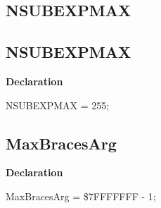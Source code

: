 \documentclass{report}
\newif\ifpdf
\begin{document}
\subsection*{\large{\textbf{NSUBEXPMAX}}\normalsize\hspace{1ex}\hrulefill}
\else
\subsection*{NSUBEXPMAX}
\fi
\label{RegExpr-NSUBEXPMAX}
\begin{list}{}{
\setlength{\itemindent}{0cm}
\setlength{\listparindent}{0cm}
\setlength{\leftmargin}{\evensidemargin}
\addtolength{\leftmargin}{\tmplength}
\settowidth{\labelsep}{X}
\addtolength{\leftmargin}{\labelsep}
\setlength{\labelwidth}{\tmplength}
}
\item[\textbf{Declaration}\hfill]
\ifpdf
\begin{flushleft}
\fi
\begin{ttfamily}
NSUBEXPMAX = 255;\end{ttfamily}

\ifpdf
\end{flushleft}
\fi

\end{list}
\ifpdf
\subsection*{\large{\textbf{MaxBracesArg}}\normalsize\hspace{1ex}\hrulefill}
\else
\subsection*{MaxBracesArg}
\fi
\label{RegExpr-MaxBracesArg}
\begin{list}{}{
\setlength{\itemindent}{0cm}
\setlength{\listparindent}{0cm}
\setlength{\leftmargin}{\evensidemargin}
\addtolength{\leftmargin}{\tmplength}
\settowidth{\labelsep}{X}
\addtolength{\leftmargin}{\labelsep}
\setlength{\labelwidth}{\tmplength}
}
\item[\textbf{Declaration}\hfill]
\ifpdf
\begin{flushleft}
\fi
\begin{ttfamily}
MaxBracesArg = {\$}7FFFFFFF - 1;\end{ttfamily}

\ifpdf
\end{flushleft}
\fi

\end{list}
\ifpdf
\end{document}
